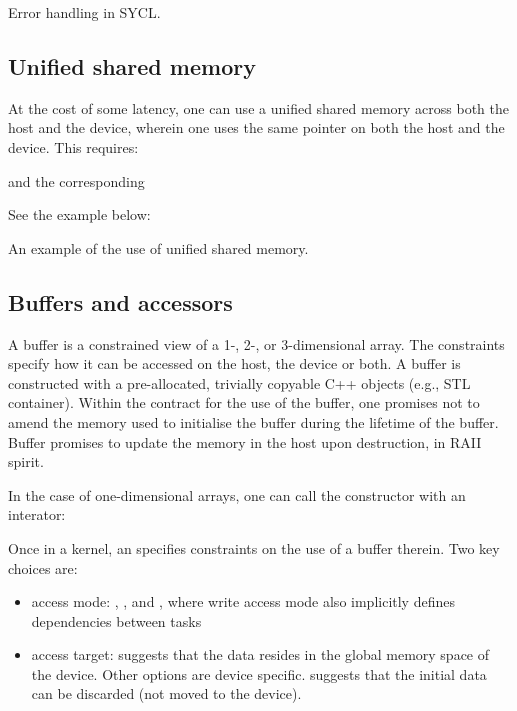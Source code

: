 \raggedbottom
\begin{codebox}[]{\href{https://godbolt.org/z/ojT66q1MY}{\ExternalLink}}
\footnotesize Error handling in SYCL.
\tcblower
{}
\end{codebox}
  
\subsection{Unified shared memory}
 
At the cost of some latency, one can use a unified shared memory across both the host and the device, wherein one uses the same pointer on both the host and the device. This requires:
 

and the corresponding 


See the example below:
\raggedbottom
\begin{codebox}[]{\href{https://godbolt.org/z/fj3Ped9zT}{\ExternalLink}}
\footnotesize An example of the use of unified shared memory.
\tcblower
{}
\end{codebox}
 
\subsection{Buffers and accessors}

A buffer is a constrained view of a 1-, 2-, or 3-dimensional array.
The constraints specify how it can be accessed on the host, the device or both. 
A buffer is constructed with a pre-allocated, trivially copyable C++ objects (e.g., STL container). 
Within the contract for the use of the buffer, 
one promises not to amend the memory used to initialise the buffer during the lifetime of the buffer. 
Buffer promises to update the memory in the host upon destruction, in RAII spirit. 

In the case of one-dimensional arrays, one can call the constructor with an interator:

Once in a kernel, an  specifies constraints on the use of a buffer therein. 
Two key choices are:
\begin{itemize}
\item access mode: , , and , where write access mode also implicitly defines dependencies between tasks
\item access target:  suggests that the data resides in the global memory space of the device. Other options are device specific.  suggests that the initial data can be discarded (not moved to the device). 
\end{itemize}

